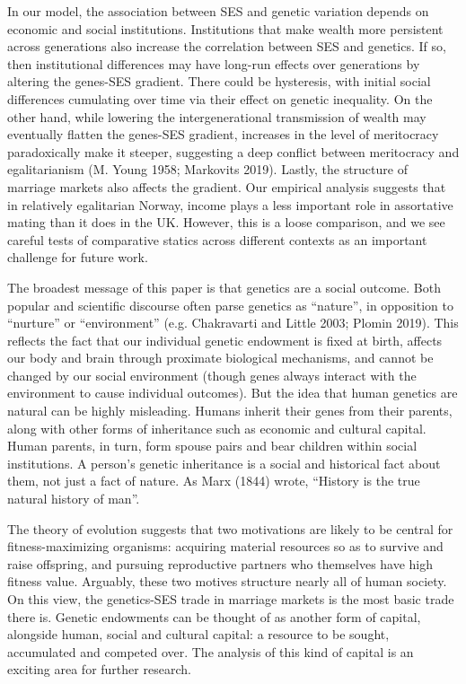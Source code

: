\documentclass[
  12pt,
]{article}
\theoremstyle{definition}
\theoremstyle{definition}
\theoremstyle{definition}
\theoremstyle{definition}
\theoremstyle{remark}
\begin{document}
In our model, the association between SES and genetic variation depends on
economic and social institutions. Institutions that make wealth more persistent
across generations also increase the correlation between SES and genetics. If
so, then institutional differences may have long-run effects over generations by
altering the genes-SES gradient. There could be hysteresis, with initial social
differences cumulating over time via their effect on genetic inequality. On the
other hand, while lowering the intergenerational transmission of wealth may
eventually flatten the genes-SES gradient, increases in the level of meritocracy
paradoxically make it steeper, suggesting a deep conflict between meritocracy
and egalitarianism (M. Young 1958; Markovits 2019). Lastly, the
structure of marriage markets also affects the gradient. Our empirical analysis
suggests that in relatively egalitarian Norway, income plays a less important role in
assortative mating than it does in the UK. However, this is a loose comparison,
and we see careful tests of comparative statics across different contexts as
an important challenge for future work.

The broadest message of this paper is that genetics are a social
outcome. Both popular and scientific discourse often parse genetics as
``nature'', in opposition to ``nurture'' or ``environment'' (e.g. Chakravarti and Little 2003; Plomin 2019). This reflects the fact that
our individual genetic endowment is fixed at birth, affects our body and brain
through proximate biological mechanisms, and cannot be changed by our social
environment (though genes always interact with the environment to cause
individual outcomes). But the idea that human genetics are natural can be highly
misleading. Humans inherit their genes from their parents, along with other
forms of inheritance such as economic and cultural capital. Human parents, in
turn, form spouse pairs and bear children within social institutions. A person's
genetic inheritance is a social and historical fact about them, not just a
fact of nature. As Marx (1844) wrote, ``History is the true natural history of
man''.

The theory of evolution suggests that two motivations are likely to be
central for fitness-maximizing organisms: acquiring material resources so as to
survive and raise offspring, and pursuing reproductive partners who themselves have
high fitness value. Arguably, these two motives structure nearly all of human society.
On this view, the genetics-SES trade in marriage markets is the most basic trade
there is. Genetic endowments can be thought of as another form of capital,
alongside human, social and cultural capital: a resource to be sought,
accumulated and competed over. The analysis of this kind of capital is an
exciting area for further research.
\end{document}
